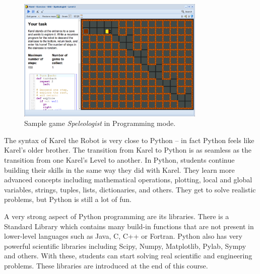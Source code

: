 \documentclass[article,A4,12pt]{llncs}
\begin{document}
\begin{figure}[!ht]
\begin{center}
\includegraphics[width=0.8\textwidth]{imgk/fore-2.png}
\end{center}
\vspace{-2mm}
\caption{Sample game {\em Speleologist} in Programming mode.}
\label{fig:f2}
\vspace{-4mm}
\end{figure}
\noindent
The syntax of Karel the Robot is very close to Python -- in fact Python feels like Karel's
older brother. The transition from Karel to Python is as seamless as the transition from 
one Karel's Level to another. 
In Python, students continue building their skills in the same way they did with Karel. 
They learn more advanced concepts including mathematical operations, plotting, local and 
global variables, strings, tuples, lists, dictionaries, and others. They get to solve 
realistic problems, but Python is still a lot of fun. 

A very strong aspect of Python programming are its libraries. There is a Standard Library which 
contains many build-in functions that are not present in lower-level languages such as 
Java, C, C++ or Fortran. Python also has very powerful scientific libraries including 
Scipy, Numpy, Matplotlib, Pylab, Sympy and others. With these, students can start solving 
real scientific and engineering problems. These libraries are introduced at the end of this 
course.  




\end{document}
